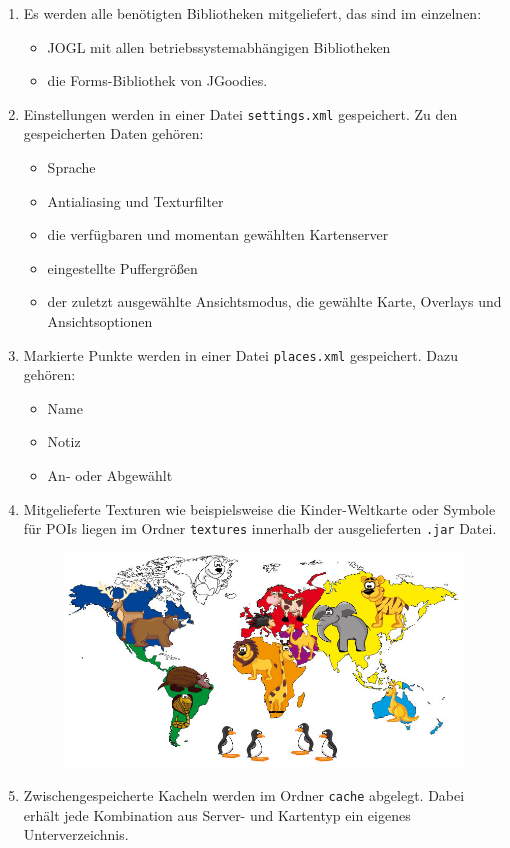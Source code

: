 \documentclass[10pt]{scrreprt}
\newcommand{\ziel}[1]{{\fontsize{9.5}{11}\textsf{/#1/}}}
\newcommand{\ziellabel}{Z}
\newcommand{\muss}{\renewcommand{\labelenumi}{\textbf{\ziel{\ziellabel\numprint{\theenumi}0}}}}
\begin{document}
\begin{enumerate}[leftmargin=2cm]
\item Es werden alle benötigten Bibliotheken mitgeliefert, das sind im einzelnen: 
\begin{itemize}
\item JOGL mit allen betriebssystemabhängigen Bibliotheken
\item die Forms-Bibliothek von JGoodies.
\end{itemize}
\muss
\item Einstellungen werden in einer Datei \texttt{settings.xml} gespeichert. Zu den gespeicherten Daten gehören:
\begin{itemize}
\item Sprache
\item Antialiasing und Texturfilter
\item die verfügbaren und momentan gewählten Kartenserver
\item eingestellte Puffergrößen
\item der zuletzt ausgewählte Ansichtsmodus, die gewählte Karte, Overlays und Ansichtsoptionen
\end{itemize}
\muss
\item Markierte Punkte werden in einer Datei \texttt{places.xml} gespeichert. Dazu gehören:
\begin{itemize}
\item Name
\item Notiz
\item An- oder Abgewählt
\end{itemize}
\item Mitgelieferte Texturen wie beispielsweise die Kinder-Weltkarte oder Symbole für POIs liegen im Ordner \texttt{textures} innerhalb der ausgelieferten \texttt{.jar} Datei.
\begin{figure}[!htb]
	\centering
	\includegraphics[scale=0.3]{Kinder-Weltkarte.jpg}
\end{figure}
\item Zwischengespeicherte Kacheln werden im Ordner \texttt{cache} abgelegt. Dabei erhält jede Kombination aus Server- und Kartentyp ein eigenes Unterverzeichnis.
\end{enumerate}
\end{document}
